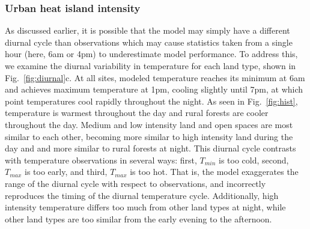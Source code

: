 \documentclass[draft,linenumbers]{agujournal}
\begin{document}
\subsubsection{Urban heat island intensity}
As discussed earlier, it is possible that the model may simply have a different diurnal cycle than observations which may cause statistics taken from a single hour (here, 6am or 4pm) to underestimate model performance. To address this, we examine the diurnal variability in temperature for each land type, shown in Fig.~\ref{fig:diurnal}c. At all sites, modeled temperature reaches its minimum at 6am and achieves maximum temperature at 1pm, cooling slightly until  7pm, at which point temperatures cool rapidly throughout the night. As seen in Fig.~\ref{fig:hist}, 
temperature is warmest throughout the day and rural forests are cooler throughout the day. Medium and low intensity land and open spaces are most similar to each other, becoming more similar to high intensity land during the day and and more similar to rural forests at night. 
This diurnal cycle contrasts with temperature observations in several ways: first, $T_{min}$ is too cold, second, $T_{max}$ is too early, and third, $T_{max}$ is too hot. That is, the model exaggerates the range of the diurnal cycle with respect to observations, and incorrectly reproduces the timing of the diurnal temperature cycle. Additionally, high intensity temperature differs too much from other land types at night, while other land types are too similar from the early evening to the afternoon. 
 
\end{document}
